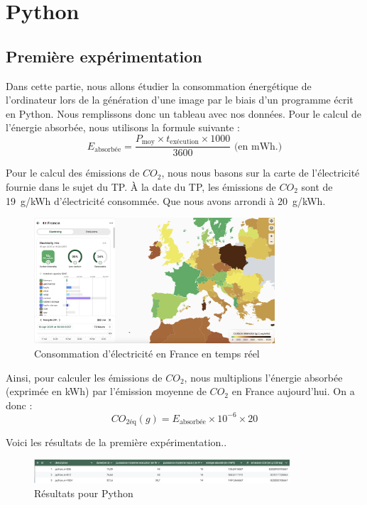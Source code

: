 \section{Python}
\subsection{Première expérimentation}

Dans cette partie, nous allons étudier la consommation énergétique de l'ordinateur lors de la génération d'une image par le biais d'un programme écrit en Python. Nous remplissons donc un tableau avec nos données.
Pour le calcul de l’énergie absorbée, nous utilisons la formule suivante :
\[
E_{\text{absorbée}} = \frac{P_{\text{moy}} \times t_{\text{exécution}} \times 1000}{3600} \text{ (en mWh.)}
\]

Pour le calcul des émissions de \(CO_2\), nous nous basons sur la carte de l'électricité fournie dans le sujet du TP. À la date du TP, les émissions de \(CO_2\) sont de 19~g/kWh d’électricité consommée. Que nous avons arrondi à 20~g/kWh.

\begin{figure}[h]
    \centering
    \includegraphics[width=0.8\textwidth]{images/electricity_map.png}
    \caption{Consommation d'électricité en France en temps réel}
\end{figure}


Ainsi, pour calculer les émissions de \(CO_2\), nous multiplions l'énergie absorbée (exprimée en kWh) par l’émission moyenne de \(CO_2\) en France aujourd'hui. On a donc :
\[
CO_{2\text{éq}}(g) = E_{\text{absorbée}} \times 10^{-6} \times 20
\]

Voici les résultats de la première expérimentation..

\begin{figure}[h]
    \centering
    \includegraphics[width=0.85\textwidth]{images/tableur1.png}
    \caption{Résultats pour Python}
\end{figure}

